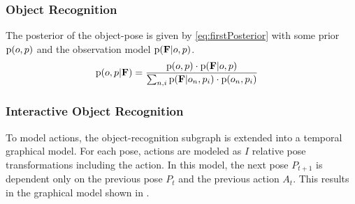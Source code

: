 %
%




 
\subsubsection{Object Recognition}            
            The posterior of the object-pose is given by \eqref{eq:firstPosterior} with some prior $\text{p}(o,p)$ and the observation model $\text{p}(\mathbf{F}|o,p)$.
            \begin{align}
                \label{eq:firstPosterior}
                \prob{o,p|\set{F}} &= \frac{\prob{o,p} \cdot \prob{\set{F}|o,p}}{\sum_{n,i} \prob{\set{F}|o_n,p_i}\cdot \prob{o_n,p_i}}                              
                \vspace{-2ex}
            \end{align}

        \subsubsection{Interactive Object Recognition}
            To model actions, the object-recognition subgraph is extended into a temporal graphical model. For each pose, actions are modeled as $I$ relative pose transformations including the  action. In this model, the next pose $P_{t+1}$ is dependent only on the previous pose $P_t$ and the previous action $A_t$. This results in the graphical model shown in .
            
